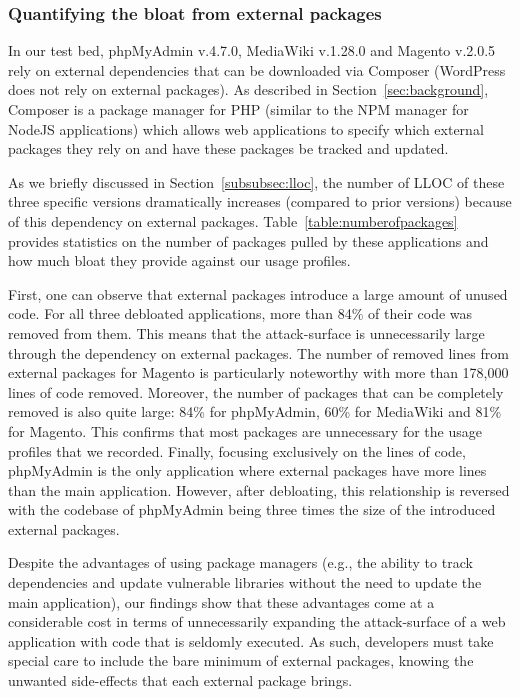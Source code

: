 \subsubsection{Quantifying the bloat from external packages}

In our test bed, phpMyAdmin v.4.7.0, MediaWiki v.1.28.0 and Magento v.2.0.5 rely
on external dependencies that can be downloaded via Composer (WordPress does not rely on external packages). As described in
Section~\ref{sec:background}, Composer is a package manager for PHP (similar
to the NPM manager for NodeJS applications) which allows web applications
to specify which external packages they rely on and have these packages be
tracked and updated.

As we briefly discussed in Section~\ref{subsubsec:lloc}, the number of LLOC of
these three specific versions dramatically
increases (compared to prior versions) because of this dependency on external
packages. Table~\ref{table:numberofpackages} provides statistics on the
number of packages pulled by these applications and how much bloat they
provide against our usage profiles.


First, one can observe that external packages introduce a large amount of
unused code. For all three debloated applications, more than 84\% of their code
was removed from them. This means that the attack-surface is unnecessarily
large through the dependency on external packages. The number of removed
lines from external packages for Magento is particularly noteworthy with
more than 178,000 lines of code removed. Moreover, the number of packages
that can be completely removed is also quite large: 84\% for phpMyAdmin,
60\% for MediaWiki and 81\% for Magento. This confirms that most packages
are unnecessary for the usage profiles that we recorded. Finally, focusing
exclusively on the lines of code, phpMyAdmin is the only application where
external packages have more lines than the main application. However, after
debloating, this relationship is reversed with the codebase of phpMyAdmin
being three times the size of the introduced external packages.


Despite the advantages of using package managers (e.g., the ability to track
dependencies and update vulnerable libraries without the need to update
the main application), our findings show that these advantages come at a
considerable cost in terms of unnecessarily expanding the attack-surface of
a web application with code that is seldomly executed. As such, developers
must take special care to include the bare minimum of external packages,
knowing the unwanted side-effects that each external package brings.

